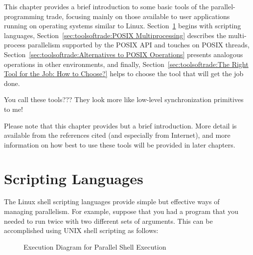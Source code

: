 
%

This chapter provides a brief introduction to some basic tools of the
parallel-programming trade, focusing mainly on those available to
user applications running on operating systems similar to Linux.
Section~\ref{sec:toolsoftrade:Scripting Languages} begins with
scripting languages,
Section~\ref{sec:toolsoftrade:POSIX Multiprocessing}
describes the multi-process parallelism supported by the POSIX API and
touches on POSIX threads,
Section~\ref{sec:toolsoftrade:Alternatives to POSIX Operations}
presents analogous operations in other environments, and finally,
Section~\ref{sec:toolsoftrade:The Right Tool for the Job: How to Choose?}
helps to choose the tool that will get the job done.

\QuickQuiz{}
	You call these tools???
	They look more like low-level synchronization primitives to me!
 \QuickQuizEnd

Please note that this chapter provides but a brief introduction.
More detail is available from the references cited (and especially
from Internet), and more information
on how best to use these tools will be provided in later chapters.

\section{Scripting Languages}
\label{sec:toolsoftrade:Scripting Languages}

The Linux shell scripting languages provide simple but effective ways
of managing parallelism.
For example, suppose that you had a program 
that you needed to run twice with two different sets of arguments.
This can be accomplished using UNIX shell scripting as follows:



\begin{figure}[tb]
\centering
{}
\caption{Execution Diagram for Parallel Shell Execution}
\label{fig:toolsoftrade:Execution Diagram for Parallel Shell Execution}
\end{figure}

